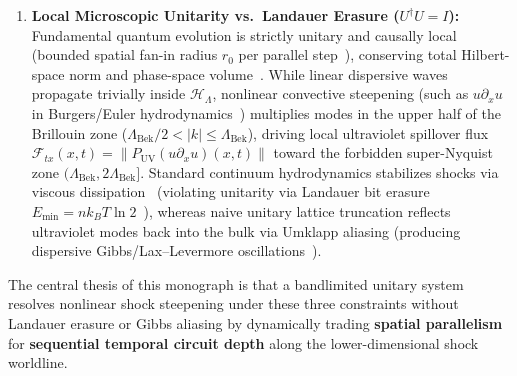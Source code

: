 \documentclass[11pt,a4paper]{article}
\theoremstyle{definition}
\begin{document}
\begin{enumerate}
\begin{equation}
C_{\text{self}} \equiv \theta_{\text{Nyq}} = \Lambda_{\text{Bek}} \nu_{\text{ML}}.
\end{equation}
\item \textbf{Local Microscopic Unitarity vs.\ Landauer Erasure ($U^\dagger U = I$):} Fundamental quantum evolution is strictly unitary and causally local (bounded spatial fan-in radius $r_0$ per parallel step~\cite{liebrobinson1972}), conserving total Hilbert-space norm and phase-space volume~\cite{bennett1973}. While linear dispersive waves propagate trivially inside $\mathcal{H}_{\Lambda}$, nonlinear convective steepening (such as $u\partial_x u$ in Burgers/Euler hydrodynamics~\cite{lax1973,whitham1974}) multiplies modes in the upper half of the Brillouin zone ($\Lambda_{\text{Bek}}/2 < |k| \le \Lambda_{\text{Bek}}$), driving local ultraviolet spillover flux $\mathcal{F}_{tx}(x,t) = \|P_{\text{UV}}(u\partial_x u)(x,t)\|$ toward the forbidden super-Nyquist zone $(\Lambda_{\text{Bek}}, 2\Lambda_{\text{Bek}}]$. Standard continuum hydrodynamics stabilizes shocks via viscous dissipation~\cite{lax1973} (violating unitarity via Landauer bit erasure $E_{\min} = n k_B T \ln 2$~\cite{landauer1961}), whereas naive unitary lattice truncation reflects ultraviolet modes back into the bulk via Umklapp aliasing (producing dispersive Gibbs/Lax--Levermore oscillations~\cite{laxlevermore1983}).
\end{enumerate}
The central thesis of this monograph is that a bandlimited unitary system resolves nonlinear shock steepening under these three constraints without Landauer erasure or Gibbs aliasing by dynamically trading \textbf{spatial parallelism} for \textbf{sequential temporal circuit depth} along the lower-dimensional shock worldline.
\end{document}
